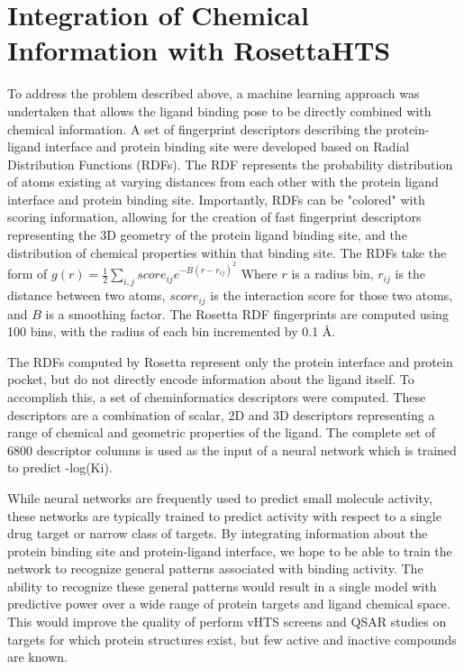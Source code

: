 \documentclass[11pt, oneside]{article}   	%
\begin{document}
\section{Integration of Chemical Information with RosettaHTS}
To address the problem described above, a machine learning approach was undertaken that allows the ligand binding pose to be directly combined with chemical information.
A set of fingerprint descriptors describing the protein-ligand interface and protein binding site were developed based on Radial Distribution Functions (RDFs).  
The RDF represents the probability distribution of atoms existing at varying distances from each other with the protein ligand interface and protein binding site.  
Importantly, RDFs can be "colored" with scoring information, allowing for the creation of fast fingerprint descriptors representing the 3D geometry of the protein ligand binding site, and the distribution of chemical properties within that binding site.  
The RDFs take the form of $g(r) =\frac{1}{2}\sum\limits_{i,j}score_{ij}e^{-B(r-r_{ij})^2}$ Where $r$ is a radius bin, $r_{ij}$ is the distance between two atoms, $score_{ij}$ is the interaction score for those two atoms, and $B$ is a smoothing factor.  
The Rosetta RDF fingerprints are computed using 100 bins, with the radius of each bin incremented by 0.1 \AA.  

The RDFs computed by Rosetta represent only the protein interface and protein pocket, but do not directly encode information about the ligand itself.  
To accomplish this, a set of cheminformatics descriptors\citep{Mueller:2012gn} were computed. 
These descriptors are a combination of scalar, 2D and 3D descriptors representing a range of chemical and geometric properties of the ligand. 
The complete set of 6800 descriptor columns is used as the input of a neural network which is trained to predict -log(Ki). 

While neural networks are frequently used to predict small molecule activity\citep{Hecht:2008gs, Mueller:2012gn, Gohlke:2002in}, these networks are typically trained to predict activity with respect to a single drug target or narrow class of targets.  
By integrating information about the protein binding site and protein-ligand interface, we hope to be able to train the network to recognize general patterns associated with binding activity.  
The ability to recognize these general patterns would result in a single model with predictive power over a wide range of protein targets and ligand chemical space.  
This would improve the quality of perform vHTS screens and QSAR studies on targets for which protein structures exist, but few active and inactive compounds are known. 
\end{document}
